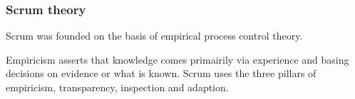 \subsubsection{Scrum theory}

Scrum was founded on the basis of empirical process control theory\cite{scrumguide11}.

Empiricism asserts that knowledge comes primairily via experience and basing 
decisions on evidence or what is known\cite{scrumguide11}. Scrum uses the three pillars of 
empiricism, transparency, inspection and adaption\cite{scrumguide11}.




